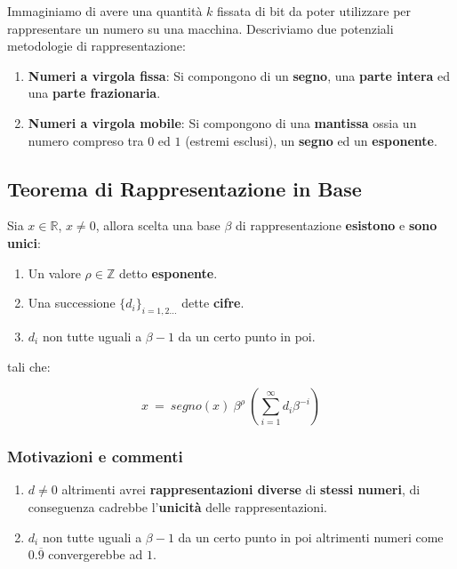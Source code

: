 \documentclass{article}
\begin{document}
Immaginiamo di avere una quantità $k$ fissata di bit da poter utilizzare per rappresentare un numero su una macchina. Descriviamo due potenziali metodologie di rappresentazione:

\begin{enumerate}
    \item \textbf{Numeri a virgola fissa}: Si compongono di un \textbf{segno}, una \textbf{parte intera} ed una \textbf{parte frazionaria}.
    \item \textbf{Numeri a virgola mobile}: Si compongono di una \textbf{mantissa} ossia un numero compreso tra $0$ ed $1$ (estremi esclusi), un \textbf{segno} ed un \textbf{esponente}.
\end{enumerate}

\subsection{Teorema di Rappresentazione in Base}

Sia $x \in \mathbb{R}$, $x \neq 0$, allora scelta una base $\beta$ di rappresentazione \textbf{esistono} e \textbf{sono unici}:

\begin{enumerate}
    \item Un valore $\rho \in \mathbb{Z}$ detto \textbf{esponente}.
    \item Una successione $ \{ d_{i} \}_{i=1,2...}$ dette \textbf{cifre}.
    \item $d_{i}$ non tutte uguali a $\beta -1$ da un certo punto in poi.
\end{enumerate}

tali che:

\[ x \: = \: segno(x) \: \beta^{\rho} \: (\sum^{\infty}_{i=1} d_{i}\beta^{-i} ) \]

\subsubsection{Motivazioni e commenti}

\begin{enumerate}
    \item $d\neq0$ altrimenti avrei \textbf{rappresentazioni diverse} di \textbf{stessi numeri}, di conseguenza cadrebbe l'\textbf{unicità} delle rappresentazioni.
    \item $d_{i}$ non tutte uguali a $\beta -1$ da un certo punto in poi altrimenti numeri come $0.\overline{9}$ convergerebbe ad $1$.
\end{enumerate}
\end{document}
